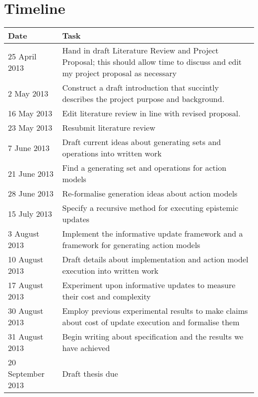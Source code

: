 \section{Timeline}

\begin{center}
	\begin{tabular}{ | l | p{10cm} |}
		\hline
		Date & Task \\
		\hline
		25 April 2013 & Hand in draft Literature Review and Project Proposal;
    this should allow time to discuss and edit my project proposal as necessary\\
		\hline
		2 May 2013 & Construct a draft introduction that succintly describes the project purpose and background.\\
		\hline
		16 May 2013 & Edit literature review in line with revised proposal.\\
		\hline
		23 May 2013 & Resubmit literature review \\
		\hline
		7 June 2013 & Draft current ideas about generating sets and operations into
		written work\\
		\hline
		21 June 2013 & Find a generating set and operations for action models \\
		\hline
		28 June 2013 & Re-formalise generation ideas about action models\\
		\hline
		15 July 2013 & Specify a recursive method for executing epistemic updates\\
		\hline
		3 August 2013 & Implement the informative update framework and a framework
		for generating action models\\
		\hline
		10 August 2013 & Draft details about implementation and action model
		execution into written work\\
		\hline
		17 August 2013 & Experiment upon informative updates to measure their cost
		and complexity \\
		\hline
		30 August 2013 & Employ previous experimental results to make claims about
		cost of update execution and formalise them \\
		\hline
		31 August 2013 & Begin writing about specification and the results we have achieved \\
		\hline
		20 September 2013 & Draft thesis due \\
		\hline
	\end{tabular}
\end{center}
